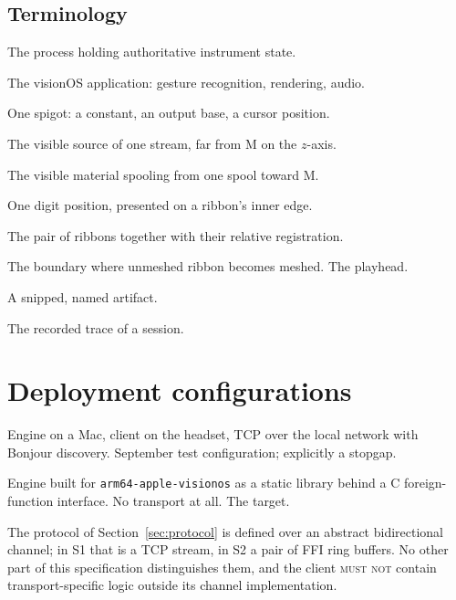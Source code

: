 \documentclass[11pt,a4paper]{article}
\newcommand{\MUSTNOT}{\textsc{must not}}
\theoremstyle{definition}
\theoremstyle{plain}
\theoremstyle{remark}
\begin{document}
\subsection{Terminology}

\begin{description}[leftmargin=2.4cm,style=nextline,font=\normalfont\itshape]
\item[Engine] The process holding authoritative instrument state.
\item[Client] The visionOS application: gesture recognition, rendering, audio.
\item[Stream] One spigot: a constant, an output base, a cursor position.
\item[Spool] The visible source of one stream, far from M on the $z$-axis.
\item[Ribbon] The visible material spooling from one spool toward M.
\item[Notch] One digit position, presented on a ribbon's inner edge.
\item[Skein] The pair of ribbons together with their relative registration.
\item[Zip front] The boundary where unmeshed ribbon becomes meshed. The playhead.
\item[Tune] A snipped, named artifact.
\item[Performance] The recorded trace of a session.
\end{description}

\section{Deployment configurations}

\begin{description}[leftmargin=1cm,style=nextline]
\item[\textbf{S1 --- Tethered.}] Engine on a Mac, client on the headset, TCP over the local network
with Bonjour discovery. September test configuration; explicitly a stopgap.
\item[\textbf{S2 --- On-device.}] Engine built for \texttt{arm64-apple-visionos} as a
static library behind a C foreign-function interface. No transport at all. The target.
\end{description}

The protocol of Section~\ref{sec:protocol} is defined over an abstract bidirectional channel; in S1
that is a TCP stream, in S2 a pair of FFI ring buffers. No other part of this specification
distinguishes them, and the client \MUSTNOT{} contain transport-specific logic outside its channel
implementation.
\end{document}
